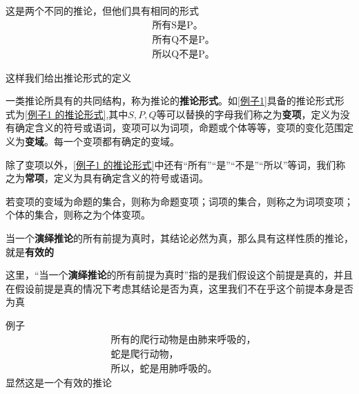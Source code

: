 这是两个不同的推论，但他们具有相同的形式
\begin{equation}\label{例子1 的推论形式}
	\begin{aligned}
		&\text{所有S是P。}\\
		&\text{所有Q不是P。}\\
		&\text{所以Q不是P。}
	\end{aligned}
\end{equation}

这样我们给出推论形式的定义
\begin{mydefinition}{}{}
	一类推论所具有的共同结构，称为推论的\textbf{推论形式}。如\ref{例子1}具备的推论形式形式为\ref{例子1 的推论形式},其中$S,P,Q$等可以替换的字母我们称之为\textbf{变项}，定义为没有确定含义的符号或语词，变项可以为词项，命题或个体等等，变项的变化范围定义为\textbf{变域}。每一个变项都有确定的变域。
	
	除了变项以外，\ref{例子1 的推论形式}中还有“所有”“是”“不是”“所以”等词，我们称之为\textbf{常项}，定义为具有确定含义的符号或语词。
\end{mydefinition}
若变项的变域为命题的集合，则称为命题变项；词项的集合，则称之为词项变项；个体的集合，则称之为个体变项。

\begin{mydefinition}{}{}
	当一个\textbf{演绎推论}的所有前提为真时，其结论必然为真，那么具有这样性质的推论，就是\textbf{有效的}
	
\end{mydefinition}
这里，“当一个\textbf{演绎推论}的所有前提为真时”指的是我们假设这个前提是真的，并且在假设前提是真的情况下考虑其结论是否为真，这里我们不在乎这个前提本身是否为真

例子
\begin{equation}
	\begin{aligned}
		&\text{所有的爬行动物是由肺来呼吸的，}\\
		&\text{蛇是爬行动物，}\\
		&\text{所以，蛇是用肺呼吸的。}
	\end{aligned}
\end{equation}
显然这是一个有效的推论














